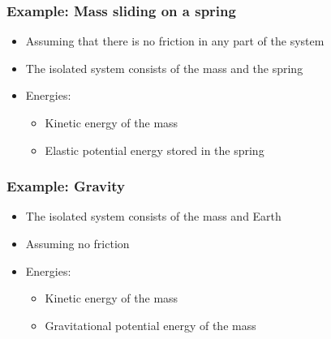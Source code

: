 \documentclass[12pt,compress,aspectratio=169]{beamer}
\newcommand{\mb}[1]{\ensuremath\mathbf{#1}}
\begin{document}
\begin{frame}
  \frametitle{Example: Mass sliding on a spring}

  \begin{itemize}
  \item Assuming that there is no friction in any part of the system
  \item The isolated system consists of the mass and the spring 
  \item Energies:
    \begin{itemize}
    \item Kinetic energy of the mass
    \item Elastic potential energy stored in the spring
    \end{itemize}
  \end{itemize}
  \begin{center}
  \end{center}
\end{frame}


\begin{frame}
  \frametitle{Example: Gravity}

  \begin{center}
  \end{center}
  
  \begin{itemize}
  \item The isolated system consists of the mass and Earth
  \item Assuming no friction
  \item Energies:
    \begin{itemize}
    \item Kinetic energy of the mass
    \item Gravitational potential energy of the mass
    \end{itemize}
  \end{itemize}
\end{frame}
\end{document}
